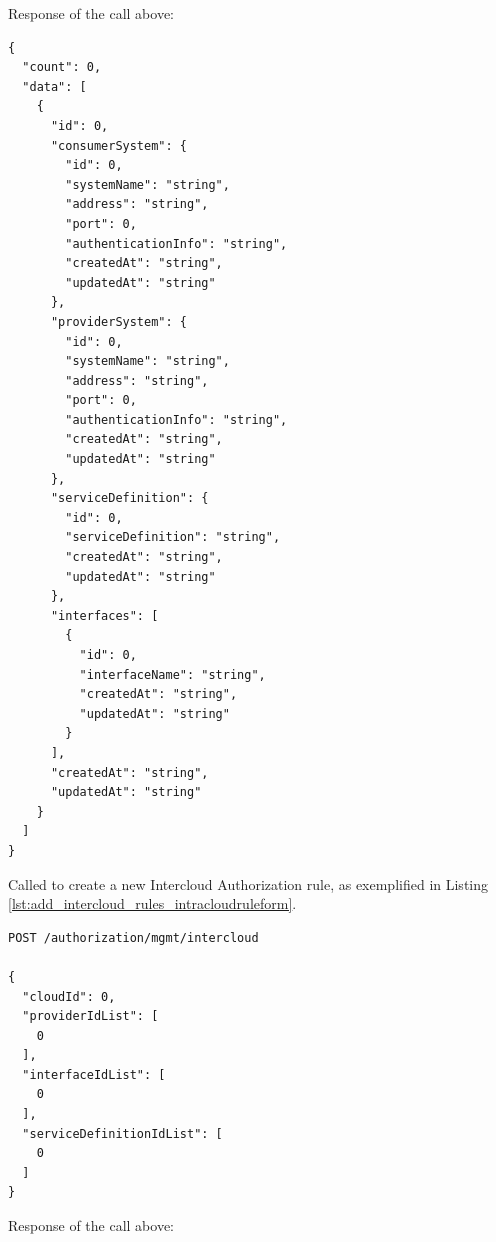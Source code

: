 \documentclass[a4paper]{arrowhead}
\newcommand{\fref}[1]{{\textcolor{ArrowheadBlue}{\hyperref[sec:functions:#1]{#1}}}}
\begin{document}
Response of the call above:

\begin{lstlisting}[language=http,label={lst:add_intracloud_rules_intracloudruleslist},caption={An \fref{Add Intracloud Rules} response is an IntracloudRuleList}]
{
  "count": 0,
  "data": [
    {
      "id": 0,
      "consumerSystem": {
        "id": 0,
        "systemName": "string",
        "address": "string",
        "port": 0,
        "authenticationInfo": "string",
        "createdAt": "string",
        "updatedAt": "string"
      },
      "providerSystem": {
        "id": 0,
        "systemName": "string",
        "address": "string",
        "port": 0,
        "authenticationInfo": "string",
        "createdAt": "string",
        "updatedAt": "string"
      },
      "serviceDefinition": {
        "id": 0,
        "serviceDefinition": "string",
        "createdAt": "string",
        "updatedAt": "string"
      },
      "interfaces": [
        {
          "id": 0,
          "interfaceName": "string",
          "createdAt": "string",
          "updatedAt": "string"
        }
      ],
      "createdAt": "string",
      "updatedAt": "string"
    }
  ]
}

\end{lstlisting}


Called to create a new Intercloud Authorization rule, as exemplified in Listing \ref{lst:add_intercloud_rules_intracloudruleform}.

\begin{lstlisting}[language=http,label={lst:add_intercloud_rules_intercloudruleform},caption={An \fref{Add Intercloud Rules} invocation.}]
POST /authorization/mgmt/intercloud

{
  "cloudId": 0,
  "providerIdList": [
    0
  ],
  "interfaceIdList": [
    0
  ],
  "serviceDefinitionIdList": [
    0
  ]
}
\end{lstlisting}

Response of the call above:
\end{document}
